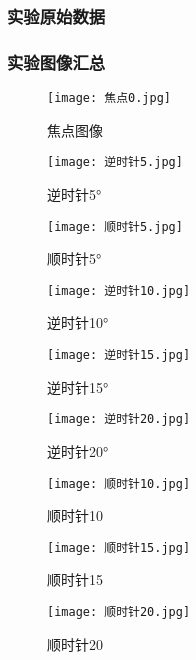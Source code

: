 \documentclass[dvipsnames, svgnames,a4paper,11pt]{article}
\begin{document}
\subsubsection{实验原始数据}

\subsubsection{实验图像汇总}
\begin{figure}[H]
	\begin{minipage}[b]{0.3\linewidth}
	  \centering
	  \texttt{[image: 焦点0.jpg]}
	  \caption{焦点图像}
	  \label{fig:sub1}
	\end{minipage}
	\hfill
	\begin{minipage}[b]{0.3\linewidth}
	  \centering
	  \texttt{[image: 逆时针5.jpg]}
	  \caption{逆时针5°}
	  \label{fig:sub2}
	\end{minipage}
	\hfill
	\begin{minipage}[b]{0.3\linewidth}
	  \centering
	  \texttt{[image: 顺时针5.jpg]}
	  \caption{顺时针5°}
	  \label{fig:sub3}
	\end{minipage}
  \end{figure}
  

  \begin{figure}[H]
	\begin{minipage}[b]{0.3\linewidth}
	  \centering
	  \texttt{[image: 逆时针10.jpg]}
	  \caption{逆时针10°}
	  \label{fig:sub1}
	\end{minipage}
	\hfill
	\begin{minipage}[b]{0.3\linewidth}
	  \centering
	  \texttt{[image: 逆时针15.jpg]}
	  \caption{逆时针15°}
	  \label{fig:sub2}
	\end{minipage}
	\hfill
	\begin{minipage}[b]{0.3\linewidth}
	  \centering
	  \texttt{[image: 逆时针20.jpg]}
	  \caption{逆时针20°}
	  \label{fig:sub3}
	\end{minipage}
  \end{figure}
  
  \begin{figure}[H]
	\begin{minipage}[b]{0.3\linewidth}
	  \centering
	  \texttt{[image: 顺时针10.jpg]}
	  \caption{顺时针10}
	\end{minipage}
	\hfill
	\begin{minipage}[b]{0.3\linewidth}
	  \centering
	  \texttt{[image: 顺时针15.jpg]}
	  \caption{顺时针15}
	\end{minipage}
	\hfill
	\begin{minipage}[b]{0.3\linewidth}
	  \centering
	  \texttt{[image: 顺时针20.jpg]}
	  \caption{顺时针20}
	\end{minipage}
  \end{figure}
\end{document}
